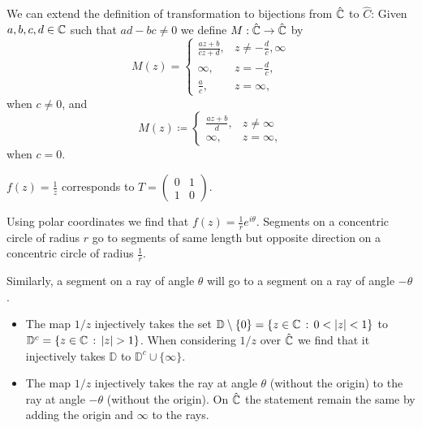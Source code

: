 \documentclass[10pt, a4paper]{article}
\begin{document}
\begin{remark}
    We can extend the definition of \mobius transformation to bijections from $\hat{\mathbb{C}}$ to $\hat{C}$:
    Given $a, b, c, d \in \mathbb{C}$ such that $ad - bc \neq 0$ we define $M : \hat{\mathbb{C}} \to \hat{\mathbb{C}}$ by
    \[
    M(z) = \begin{cases}
        \frac{az + b}{cz + d}, &z \neq -\frac{d}{c}, \infty \\
        \infty, &z = -\frac{d}{c}, \\
        \frac{a}{c}, & z = \infty,
    \end{cases}
    \]
    when $c \neq 0$,
    and
    \[
    M(z) \coloneqq \begin{cases}
        \frac{az + b}{d}, &z \neq \infty \\
        \infty, &z = \infty,
    \end{cases}
    \]
    when $c = 0$.
\end{remark}

\begin{example}
    $f(z) = \frac{1}{z}$ corresponds to $T = \begin{pmatrix}
        0 & 1 \\ 1 & 0
    \end{pmatrix}$.

    Using polar coordinates we find that $f(z) = \frac{1}{r}e ^ {i\theta}$.
    Segments on a concentric circle of radius $r$ go to segments of same length but opposite direction on a concentric circle of radius $\frac{1}{r}$.
\end{example}

Similarly,
a segment on a ray of angle $\theta$ will go to a segment on a ray of angle $-\theta$.

\begin{lemma}\phantom{}
    \begin{itemize}
        \item The map $1 / z$ injectively takes the set $\mathbb{D} \setminus \{0\} = \{z \in \mathbb{C}\,:\, 0 < |z| < 1\}$ to $\mathbb{D} ^ c = \{z \in \mathbb{C}\,:\, |z| > 1\}$.
        When considering $1 / z$ over $\hat{\mathbb{C}}$ we find that it injectively takes $\mathbb{D}$ to $\mathbb{D} ^ c \cup \{\infty\}$.

        \item The map $1 / z$ injectively takes the ray at angle $\theta$
        (without the origin)
        to the ray at angle $-\theta$
        (without the origin).
        On $\hat{\mathbb{C}}$ the statement remain the same by adding the origin and $\infty$ to the rays.
    \end{itemize}
\end{lemma}
\end{document}
